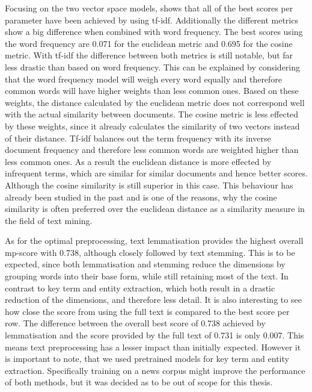 Focusing on the two vector space models, shows that all of the best scores per parameter have been achieved by using tf-idf. Additionally the different metrics show a big difference when combined with word frequency. The best scores using the word frequency are 0.071 for the euclidean metric and 0.695 for the cosine metric. With tf-idf the difference between both metrics is still notable, but far less drastic than based on word frequency. This can be explained by considering that the word frequency model will weigh every word equally and therefore common words will have higher weights than less common ones. Based on these weights, the distance calculated by the euclidean metric does not correspond well with the actual similarity between documents. The cosine metric is less effected by these weights, since it already calculates the similarity of two vectors instead of their distance. Tf-idf balances out the term frequency  with its inverse document frequency and therefore less common words are weighted higher than less common ones. As a result the euclidean distance is more effected by infrequent terms, which are similar for similar documents and hence better scores. Although the cosine similarity is still superior in this case. 
This behaviour has already been studied in the past\cite{Strehl00impactof}\cite{similarity_measures} and is one of the reasons, why the cosine similarity is often preferred over the euclidean distance as a similarity measure in the field of text mining.

As for the optimal preprocessing, text lemmatisation provides the highest overall mp-score with 0.738, although closely followed by text stemming. This is to be expected, since both lemmatisation and stemming reduce the dimensions by grouping words into their base form, while still retaining most of the text.
In contrast to key term and entity extraction, which both result in a drastic reduction of the dimensions, and therefore less detail. It is also interesting to see how close the score from using the full text is compared to the best score per row. The difference between the overall best score of 0.738 achieved by lemmatisation and the score provided by the full text of 0.731 is only 0.007. This means text preprocessing has a lesser impact than initially expected.   
However it is important to note, that we used pretrained models for key term and entity extraction.
Specifically training on a news corpus might improve the performance of both methods, but it was decided as to be out of scope for this thesis.

